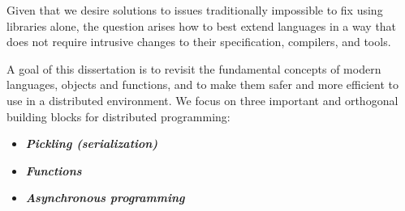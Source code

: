 Given that we desire solutions to issues traditionally impossible to fix using libraries alone, the question arises how to best extend languages in a way that does not require intrusive changes to their specification, compilers, and tools.

A goal of this dissertation is to revisit the fundamental concepts of modern
languages, objects and functions, and to make them safer and more efficient to
use in a distributed environment. We focus on three important and orthogonal
building blocks for distributed programming:


\begin{itemize}
  \item {\bf \em Pickling (serialization)}
  \item {\bf \em Functions}
  \item {\bf \em Asynchronous programming}
\end{itemize}


